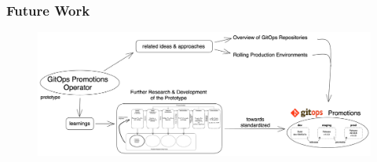 \documentclass{beamer}
\begin{document}
\begin{frame}
\frametitle{Future Work}

\begin{figure}[h]
	\centering
	\includegraphics[width=1.0\linewidth]{assets/future-work-gitops-thesis-2.png}
	\label{fig:future-work-gitops-thesis-2}	
\end{figure}


\end{frame}




\end{document}
